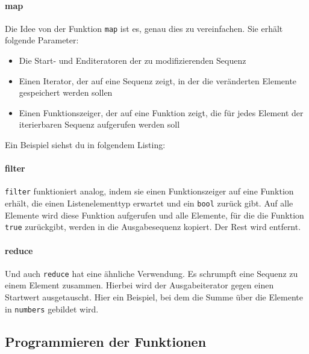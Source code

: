 \paragraph{map}
Die Idee von der Funktion \lstinline{map} ist es, genau dies zu vereinfachen.
Sie erhält folgende Parameter: 
\begin{itemize}
    \item Die Start- und Enditeratoren der zu modifizierenden Sequenz
    \item Einen Iterator, der auf eine Sequenz zeigt, in der die veränderten Elemente gespeichert werden sollen
    \item Einen Funktionszeiger, der auf eine Funktion zeigt, die für jedes Element der iterierbaren Sequenz aufgerufen werden soll
\end{itemize}

Ein Beispiel siehst du in folgendem Listing:



\paragraph{filter}
\lstinline{filter} funktioniert analog, indem sie einen Funktionszeiger auf eine Funktion erhält, die einen Listenelementtyp erwartet und ein \lstinline{bool} zurück gibt.
Auf alle Elemente wird diese Funktion aufgerufen und alle Elemente, für die die Funktion \lstinline{true} zurückgibt, werden in die Ausgabesequenz kopiert. Der Rest wird entfernt. \\



\paragraph{reduce}
Und auch \lstinline{reduce} hat eine ähnliche Verwendung.
Es schrumpft eine Sequenz zu einem Element zusammen.
Hierbei wird der Ausgabeiterator gegen einen Startwert ausgetauscht.
Hier ein Beispiel, bei dem die Summe über die Elemente in \lstinline{numbers} gebildet wird.



\subsection{Programmieren der Funktionen}
\label{sec:map-filter-reduce-basic-impl}

